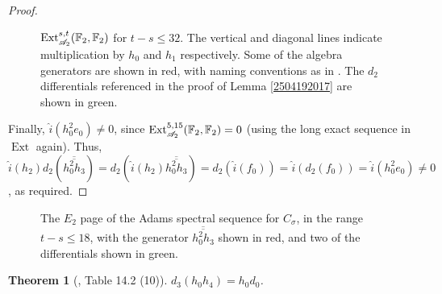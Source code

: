\documentclass[11pt, titlepage]{article} %
\def\bb{\ensuremath\mathbb}
\def\A{\ensuremath{\mathscr{A}_2}}
\DeclareMathOperator{\Ext}{Ext}
\numberwithin{equation}{subsection}
\theoremstyle{plain}
\newtheorem{theorem}{Theorem}[subsection]
\theoremstyle{definition}
\begin{document}
\begin{proof}
\begin{landscape}
\begin{figure}
\centering

\caption{\(\Ext^{s,t}_{\A}(\bb{F}_2, \bb{F}_2)\) for \(t-s\leq 32\). The vertical and diagonal lines indicate multiplication by \(h_0\) and \(h_1\) respectively. Some of the algebra generators are shown in red, with naming conventions as in \autocite{rognes2}. The \(d_2\) differentials referenced in the proof of Lemma \ref{2504192017} are shown in green.}
\label{2504201924}
\end{figure}
\end{landscape}

Finally, \(\hat i(h_0^2e_0)\neq 0\), since \(\Ext_{\A}^{5,15}(\bb{F}_2, \bb{F}_2)=0\) (using the long exact sequence in \(\Ext\) again). Thus, \(\hat i(h_2)d_2(\overline{\overline{h_0^2h_3}})= d_2(\hat i(h_2)\overline{\overline{h_0^2h_3}})=
d_2(\hat i(f_0))=\hat i(d_2(f_0))=\hat i(h_0^2e_0)\neq 0\), as required. 
\end{proof}

\begin{figure}
\centering

\caption{The \(E_2\) page of the Adams spectral sequence for \(C_\sigma\), in the range \(t-s\leq 18\), with the generator \(\overline{\overline{h_0^2h_3}}\) shown in red, and two of the differentials shown in green.}
\label{2504131812}
\end{figure}

\begin{theorem}[{\autocite{rognes2}, Table 14.2 (10)}]
\(d_3(h_0h_4)=h_0d_0\).
\end{theorem}
\end{document}
